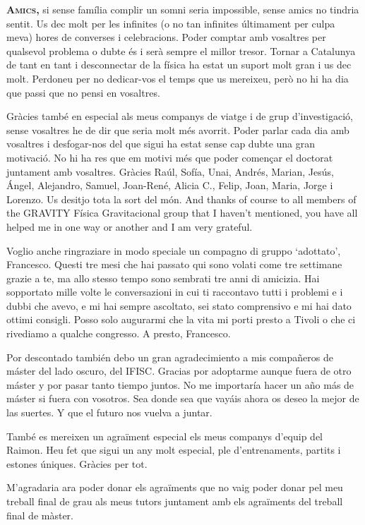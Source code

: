 \textsc{\textbf{Amics,}} si sense família complir un somni seria impossible, sense amics no tindria sentit. Us dec molt per les infinites (o no tan infinites últimament per culpa meva) hores de converses i celebracions. Poder comptar amb vosaltres per qualsevol problema o dubte és i serà sempre el millor tresor. Tornar a Catalunya de tant en tant i desconnectar de la física ha estat un suport molt gran i us dec molt. Perdoneu per no dedicar-vos el temps que us mereixeu, però no hi ha dia que passi que no pensi en vosaltres.

Gràcies també en especial als meus companys de viatge i de grup d'investigació, sense vosaltres he de dir que seria molt més avorrit. Poder parlar cada dia amb vosaltres i desfogar-nos del que sigui ha estat sense cap dubte una gran motivació. No hi ha res que em motivi més que poder començar el doctorat juntament amb vosaltres. Gràcies Raúl, Sofía, Unai, Andrés, Marian, Jesús, Ángel, Alejandro, Samuel, Joan-René, Alicia C., Felip, Joan, Maria, Jorge i Lorenzo. Us desitjo tota la sort del món. And thanks of course to all members of the GRAVITY Física Gravitacional group that I haven't mentioned, you have all helped me in one way or another and I am very grateful.

Voglio anche ringraziare in modo speciale un compagno di gruppo `adottato', Francesco. Questi tre mesi che hai passato qui sono volati come tre settimane grazie a te, ma allo stesso tempo sono sembrati tre anni di amicizia. Hai sopportato mille volte le conversazioni in cui ti raccontavo tutti i problemi e i dubbi che avevo, e mi hai sempre ascoltato, sei stato comprensivo e mi hai dato ottimi consigli. Posso solo augurarmi che la vita mi porti presto a Tivoli o che ci rivediamo a qualche congresso. A presto, Francesco.


Por descontado también debo un gran agradecimiento a mis compañeros de máster del lado oscuro, del IFISC. Gracias por adoptarme aunque fuera de otro máster y por pasar tanto tiempo juntos. No me importaría hacer un año más de máster si fuera con vosotros. Sea donde sea que vayáis ahora os deseo la mejor de las suertes. Y que el futuro nos vuelva a juntar.

També es mereixen un agraïment especial els meus companys d'equip del Raimon. Heu fet que sigui un any molt especial, ple d'entrenaments, partits i estones úniques. Gràcies per tot.

M'agradaria ara poder donar els agraïments que no vaig poder donar pel meu treball final de grau als meus tutors juntament amb els agraïments del treball final de màster.


